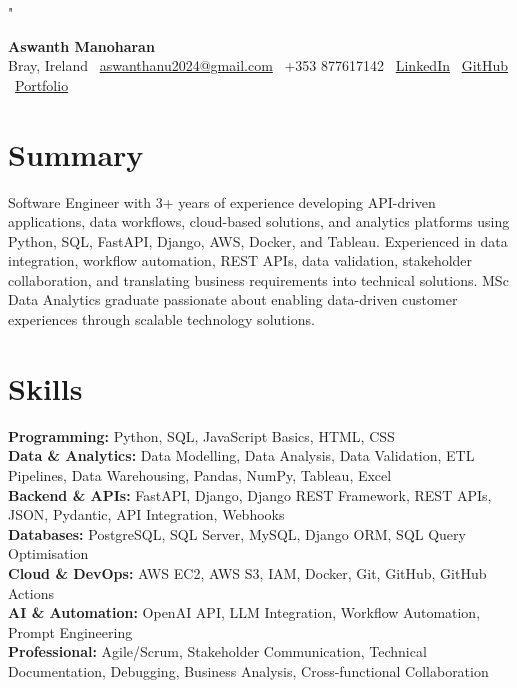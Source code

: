 "\documentclass[10pt,a4paper]{article}
\begin{document}
\begin{center}
{\Large \textbf{Aswanth Manoharan}} \\[2pt]
Bray, Ireland \textbar\
\href{mailto:aswanthanu2024@gmail.com}{aswanthanu2024@gmail.com} \textbar\
+353 877617142 \textbar\
\href{https://www.linkedin.com/in/aswanth-manoharan}{LinkedIn} \textbar\
\href{https://github.com/AswanthAnu}{GitHub} \textbar\
\href{https://aswanth-manoharan-portfolio.netlify.app/}{Portfolio}
\end{center}
\section{Summary}
Software Engineer with 3+ years of experience developing API-driven applications, data workflows, cloud-based solutions, and analytics platforms using Python, SQL, FastAPI, Django, AWS, Docker, and Tableau. Experienced in data integration, workflow automation, REST APIs, data validation, stakeholder collaboration, and translating business requirements into technical solutions. MSc Data Analytics graduate passionate about enabling data-driven customer experiences through scalable technology solutions.
\section{Skills}
\textbf{Programming:} Python, SQL, JavaScript Basics, HTML, CSS \\
\textbf{Data \& Analytics:} Data Modelling, Data Analysis, Data Validation, ETL Pipelines, Data Warehousing, Pandas, NumPy, Tableau, Excel \\
\textbf{Backend \& APIs:} FastAPI, Django, Django REST Framework, REST APIs, JSON, Pydantic, API Integration, Webhooks \\
\textbf{Databases:} PostgreSQL, SQL Server, MySQL, Django ORM, SQL Query Optimisation \\
\textbf{Cloud \& DevOps:} AWS EC2, AWS S3, IAM, Docker, Git, GitHub, GitHub Actions \\
\textbf{AI \& Automation:} OpenAI API, LLM Integration, Workflow Automation, Prompt Engineering \\
\textbf{Professional:} Agile/Scrum, Stakeholder Communication, Technical Documentation, Debugging, Business Analysis, Cross-functional Collaboration
\end{document}
